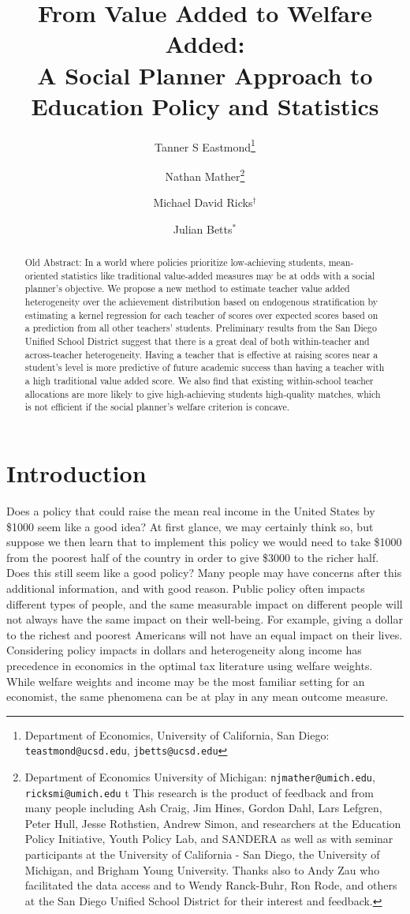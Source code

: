 \documentclass{article}
\title{From Value Added to Welfare Added: \\ A Social Planner Approach to Education Policy and Statistics}
\author{Tanner S Eastmond\thanks{Department of Economics, University of California, San Diego: \texttt{teastmond@ucsd.edu}, \texttt{jbetts@ucsd.edu}} \and Nathan Mather\thanks{Department of Economics University of Michigan: \texttt{njmather@umich.edu}, \texttt{ricksmi@umich.edu} \hspace{11em} {\color{white}t} This research is the product of feedback and from many people including Ash Craig, Jim Hines, Gordon Dahl, Lars Lefgren, Peter Hull, Jesse Rothstien,  Andrew Simon, and  researchers at the Education Policy Initiative, Youth Policy Lab, and SANDERA as well as with seminar participants at the University of California - San Diego, the University of Michigan, and Brigham Young University. Thanks also to Andy Zau who facilitated the data access and to  Wendy Ranck-Buhr, Ron Rode, and others at the San Diego Unified School District for their interest and feedback.} \and Michael David Ricks$^\dagger$ \and Julian Betts$^*$}
\date{\parbox{\linewidth}{\centering%
  This Draft Updated: \today\endgraf
  }}
\theoremstyle{definition}
\theoremstyle{definition}
\theoremstyle{definition}
\begin{document}
\maketitle



\onehalfspacing

\begin{abstract}
{\color{red}Old Abstract:} In a world where policies prioritize low-achieving students, mean-oriented statistics like traditional value-added measures may be at odds with a social planner’s objective. We propose a new method to estimate teacher value added heterogeneity over the achievement distribution based on endogenous stratification by estimating a kernel regression for each teacher of scores over expected scores based on a prediction from all other teachers’ students.  Preliminary results from the San Diego Unified School District suggest that there is a great deal of both within-teacher and across-teacher heterogeneity. Having a teacher that is effective at raising scores near a student’s level is more predictive of future academic success than having a teacher with a high traditional value added score. We also find that existing within-school teacher allocations are more likely to give high-achieving students high-quality matches, which is not efficient if the social planner’s welfare criterion is concave.


\end{abstract}


\doublespacing
\vfill
\pagebreak


\section{Introduction}

Does a policy that could raise the mean real income in the United States by \$1000 seem like a good idea? At first glance, we may certainly think so, but suppose we then learn that to implement this policy we would need to take \$1000 from the poorest half of the country in order to give \$3000 to the richer half. Does this still seem like a good policy? Many people may have concerns after this additional information, and with good reason. Public policy often impacts different types of people, and the same measurable impact on different people will not always have the same impact on their well-being. For example, giving a dollar to the richest and poorest Americans will not have an equal impact on their lives. Considering policy impacts in dollars and heterogeneity along income has precedence in economics in the optimal tax literature using welfare weights. While welfare weights and income may be the most familiar setting for an economist, the same phenomena can be at play in any mean outcome measure.
\end{document}
